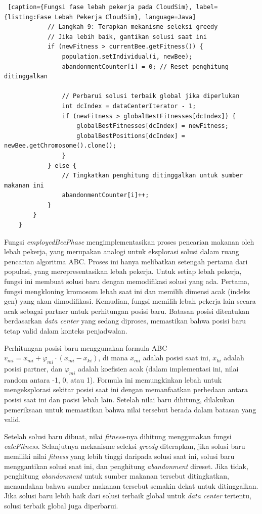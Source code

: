 \begin{lstlisting} [caption={Fungsi fase lebah pekerja pada CloudSim}, label={listing:Fase Lebah Pekerja CloudSim}, language=Java]
            // Langkah 9: Terapkan mekanisme seleksi greedy
            // Jika lebih baik, gantikan solusi saat ini
            if (newFitness > currentBee.getFitness()) {
                population.setIndividual(i, newBee);
                abandonmentCounter[i] = 0; // Reset penghitung ditinggalkan
                
                // Perbarui solusi terbaik global jika diperlukan
                int dcIndex = dataCenterIterator - 1;
                if (newFitness > globalBestFitnesses[dcIndex]) {
                    globalBestFitnesses[dcIndex] = newFitness;
                    globalBestPositions[dcIndex] = newBee.getChromosome().clone();
                }
            } else {
                // Tingkatkan penghitung ditinggalkan untuk sumber makanan ini
                abandonmentCounter[i]++;
            }
        }
    }
\end{lstlisting}

Fungsi \textit{employedBeePhase} mengimplementasikan proses pencarian makanan oleh lebah pekerja, yang merupakan analogi untuk eksplorasi solusi dalam ruang pencarian algoritma ABC. Proses ini hanya melibatkan setengah pertama dari populasi, yang merepresentasikan lebah pekerja. Untuk setiap lebah pekerja, fungsi ini membuat solusi baru dengan memodifikasi solusi yang ada. Pertama, fungsi mengkloning kromosom lebah saat ini dan memilih dimensi acak (indeks gen) yang akan dimodifikasi. Kemudian, fungsi memilih lebah pekerja lain secara acak sebagai partner untuk perhitungan posisi baru. Batasan posisi ditentukan berdasarkan \textit{data center} yang sedang diproses, memastikan bahwa posisi baru tetap valid dalam konteks penjadwalan.

Perhitungan posisi baru menggunakan formula ABC $v_{mi} = x_{mi} + \varphi_{mi} \cdot (x_{mi} - x_{ki})$, di mana $x_{mi}$ adalah posisi saat ini, $x_{ki}$ adalah posisi partner, dan $\varphi_{mi}$ adalah koefisien acak (dalam implementasi ini, nilai random antara -1, 0, atau 1). Formula ini memungkinkan lebah untuk mengeksplorasi sekitar posisi saat ini dengan memanfaatkan perbedaan antara posisi saat ini dan posisi lebah lain. Setelah nilai baru dihitung, dilakukan pemeriksaan untuk memastikan bahwa nilai tersebut berada dalam batasan yang valid.

Setelah solusi baru dibuat, nilai \textit{fitness}-nya dihitung menggunakan fungsi \textit{calcFitness}. Selanjutnya mekanisme seleksi \textit{greedy} diterapkan, jika solusi baru memiliki nilai \textit{fitness} yang lebih tinggi daripada solusi saat ini, solusi baru menggantikan solusi saat ini, dan penghitung \textit{abandonment} direset. Jika tidak, penghitung \textit{abandonment} untuk sumber makanan tersebut ditingkatkan, menandakan bahwa sumber makanan tersebut semakin dekat untuk ditinggalkan. Jika solusi baru lebih baik dari solusi terbaik global untuk \textit{data center} tertentu, solusi terbaik global juga diperbarui.

